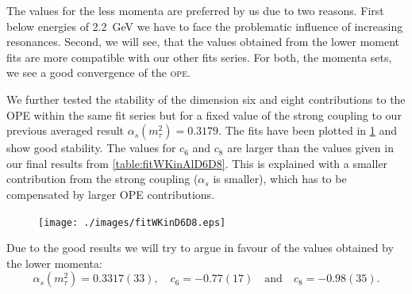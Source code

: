 \documentclass[../../index.tex]{subfiles}
\begin{document}
The values for the less momenta are preferred by us due to two reasons. First
below energies of \SI{2.2}{\giga\eV} we have to face the problematic influence
of increasing resonances. Second, we will see, that the values obtained from the
lower moment fits are more compatible with our other fits series. For both, the
momenta sets, we see a good convergence of the \textsc{ope}.

We further tested the stability of the dimension six and eight contributions to
the OPE within the same fit series but for a fixed value of the strong coupling 
to our previous averaged result $\alpha_s(m_\tau^2)=0.3179$. The fits have been
plotted in \cref{fig:fitWKinD6D8} and show good stability. The values for $c_6$
and $c_8$ are larger than the values given in our final results from
\cref{table:fitWKinAlD6D8}. This is explained with a smaller contribution from
the strong coupling ($\alpha_s$ is smaller), which has to be compensated by
larger OPE contributions. 
\begin{figure}
  \centering
  \texttt{[image: ./images/fitWKinD6D8.eps]}
  \caption{}
  \label{fig:fitWKinD6D8}
\end{figure}

Due to the good results we will try to argue in favour of the values obtained by
the lower momenta:
\begin{equation}
  \label{eq:wKinResult}
  \alpha_s(m_\tau^2) = 0.3317(33), \quad c_6 = -0.77(17) \quad \text{and} \quad
  c_8 = -0.98(35).
\end{equation}
\end{document}
